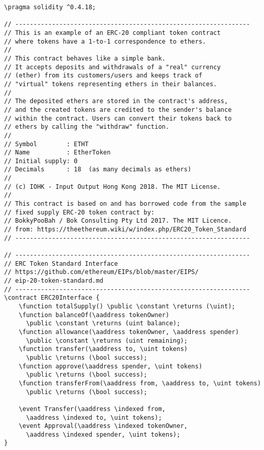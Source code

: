 \documentclass{llncs}
\newcommand{\red}[1]{\textcolor[rgb]{1,0,0}{#1}}
\newcommand{\blue}[1]{\textcolor[rgb]{0,0,1}{#1}}
\newcommand{\brown}[1]{\textcolor[rgb]{0.8,0.6,0.4}{#1}}
\newcommand{\verbsize}{\small}
\newcommand{\pragma}{\red{pragma}}
\newcommand{\contract}{\red{contract}}
\newcommand{\function}{\blue{function}}
\newcommand{\event}{\blue{event}}
\newcommand{\returns}{\blue{returns}}
\newcommand{\public}{\blue{public}}
\newcommand{\constant}{\blue{constant}}
\newcommand{\indexed}{\blue{indexed}}
\newcommand{\uint}{\brown{uint}}
\newcommand{\bool}{\brown{bool}}
\newcommand{\aaddress}{\brown{address}}
\begin{document}
\begin{small}
\begin{Verbatim}[commandchars=\\\?\?,fontsize=\verbsize]
\pragma solidity ^0.4.18;

// ----------------------------------------------------------------
// This is an example of an ERC-20 compliant token contract
// where tokens have a 1-to-1 correspondence to ethers.
//
// This contract behaves like a simple bank.
// It accepts deposits and withdrawals of a "real" currency
// (ether) from its customers/users and keeps track of
// "virtual" tokens representing ethers in their balances.
//
// The deposited ethers are stored in the contract's address,
// and the created tokens are credited to the sender's balance
// within the contract. Users can convert their tokens back to
// ethers by calling the "withdraw" function.
//
// Symbol        : ETHT
// Name          : EtherToken
// Initial supply: 0
// Decimals      : 18  (as many decimals as ethers)
//
// (c) IOHK - Input Output Hong Kong 2018. The MIT License.
//
// This contract is based on and has borrowed code from the sample
// fixed supply ERC-20 token contract by:
// BokkyPooBah / Bok Consulting Pty Ltd 2017. The MIT Licence.
// from: https://theethereum.wiki/w/index.php/ERC20_Token_Standard
// ----------------------------------------------------------------

// ----------------------------------------------------------------
// ERC Token Standard Interface
// https://github.com/ethereum/EIPs/blob/master/EIPS/
// eip-20-token-standard.md
// ----------------------------------------------------------------
\contract ERC20Interface {
    \function totalSupply() \public \constant \returns (\uint);
    \function balanceOf(\aaddress tokenOwner)
      \public \constant \returns (uint balance);
    \function allowance(\aaddress tokenOwner, \aaddress spender)
      \public \constant \returns (uint remaining);
    \function transfer(\aaddress to, \uint tokens)
      \public \returns (\bool success);
    \function approve(\aaddress spender, \uint tokens)
      \public \returns (\bool success);
    \function transferFrom(\aaddress from, \aaddress to, \uint tokens)
      \public \returns (\bool success);

    \event Transfer(\aaddress \indexed from,
      \aaddress \indexed to, \uint tokens);
    \event Approval(\aaddress \indexed tokenOwner,
      \aaddress \indexed spender, \uint tokens);
}


\end{Verbatim}
\end{small}
\end{document}

